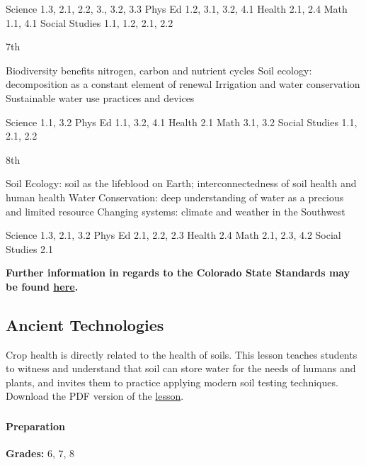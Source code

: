 \documentclass[12pt,]{article}
\let\oldparagraph\paragraph
\renewcommand{\paragraph}[1]{\oldparagraph{#1}\mbox{}}
\begin{document}
Science 1.3, 2.1, 2.2, 3., 3.2, 3.3
Phys Ed 1.2, 3.1, 3.2, 4.1
Health 2.1, 2.4
Math 1.1, 4.1
Social Studies 1.1, 1.2, 2.1, 2.2

7th

Biodiversity benefits nitrogen, carbon and nutrient cycles
Soil ecology: decomposition as a constant element of renewal
Irrigation and water conservation
Sustainable water use practices and devices

Science 1.1, 3.2
Phys Ed 1.1, 3.2, 4.1
Health 2.1
Math 3.1, 3.2
Social Studies 1.1, 2.1, 2.2

8th

Soil Ecology: soil as the lifeblood on Earth; interconnectedness of soil health and human health
Water Conservation: deep understanding of water as a precious and limited resource
Changing systems: climate and weather in the Southwest

Science 1.3, 2.1, 3.2
Phys Ed 2.1, 2.2, 2.3
Health 2.4
Math 2.1, 2.3, 4.2
Social Studies 2.1

\textbf{Further information in regards to the Colorado State Standards may be found \href{http://www2.cde.state.co.us/scripts/allstandards/COStandards.asp}{here}.}

\hypertarget{ancient-technologies}{%
\subsection{Ancient Technologies}\label{ancient-technologies}}

Crop health is directly related to the health of soils. This lesson teaches students to witness and understand that soil can store water for the needs of humans and plants, and invites them to practice applying modern soil testing techniques. Download the PDF version of the \href{./lessons/PFP_Lesson-4_Ancient-Technologies.pdf}{lesson}.

\hypertarget{section-3}{%
\subsubsection*{}\label{section-3}}

\hypertarget{preparation-3}{%
\paragraph{Preparation}\label{preparation-3}}

\textbf{Grades:} 6, 7, 8
\end{document}
